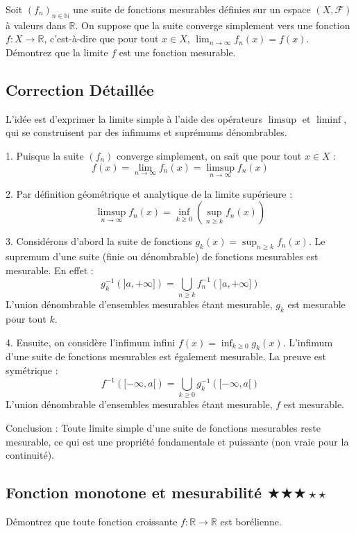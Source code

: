 \documentclass[11pt,a4paper]{article}
\begin{document}
Soit $(f_n)_{n \in \mathbb{N}}$ une suite de fonctions mesurables définies sur un espace $(X, \mathcal{F})$ à valeurs dans $\mathbb{R}$.
On suppose que la suite converge simplement vers une fonction $f : X \to \mathbb{R}$, c'est-à-dire que pour tout $x \in X$, $\lim_{n \to \infty} f_n(x) = f(x)$.
Démontrez que la limite $f$ est une fonction mesurable.

\subsection*{Correction Détaillée}

L'idée est d'exprimer la limite simple à l'aide des opérateurs $\limsup$ et $\liminf$, qui se construisent par des infimums et suprémums dénombrables.

1. Puisque la suite $(f_n)$ converge simplement, on sait que pour tout $x \in X$ :
   $$ f(x) = \lim_{n \to \infty} f_n(x) = \limsup_{n \to \infty} f_n(x) $$

2. Par définition géométrique et analytique de la limite supérieure :
   $$ \limsup_{n \to \infty} f_n(x) = \inf_{k \geq 0} \left( \sup_{n \geq k} f_n(x) \right) $$

3. Considérons d'abord la suite de fonctions $g_k(x) = \sup_{n \geq k} f_n(x)$.
   Le supremum d'une suite (finie ou dénombrable) de fonctions mesurables est mesurable. En effet :
   $$ g_k^{-1}(]a, +\infty]) = \bigcup_{n \ge k} f_n^{-1}(]a, +\infty]) $$
   L'union dénombrable d'ensembles mesurables étant mesurable, $g_k$ est mesurable pour tout $k$.

4. Ensuite, on considère l'infimum infini $f(x) = \inf_{k \geq 0} g_k(x)$.
   L'infimum d'une suite de fonctions mesurables est également mesurable. La preuve est symétrique :
   $$ f^{-1}([-\infty, a[) = \bigcup_{k \geq 0} g_k^{-1}([-\infty, a[) $$
   L'union dénombrable d'ensembles mesurables étant mesurable, $f$ est mesurable.

Conclusion : Toute limite simple d'une suite de fonctions mesurables reste mesurable, ce qui est une propriété fondamentale et puissante (non vraie pour la continuité).


\vspace{0.5cm}

\subsection*{Fonction monotone et mesurabilité \quad $\bigstar\bigstar\bigstar\star\star$}

Démontrez que toute fonction croissante $f : \mathbb{R} \to \mathbb{R}$ est borélienne.
\end{document}
